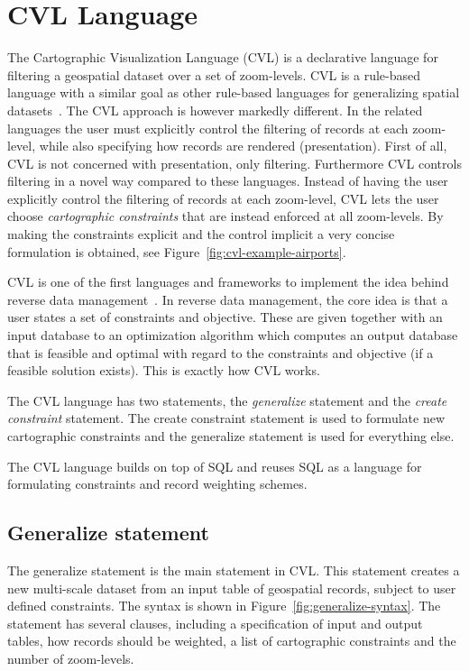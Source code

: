 \section{CVL Language}
\label{sec:cvl-language}
The Cartographic Visualization Language (CVL) is a declarative language for filtering a geospatial dataset over a set of zoom-levels. CVL is a rule-based language with a similar goal as other rule-based languages for generalizing spatial datasets~\cite{sld,mapnik}. The CVL approach is however markedly different. In the related languages the user must explicitly control the filtering of records at each zoom-level, while also specifying how records are rendered (presentation). First of all, CVL is not concerned with presentation, only filtering. Furthermore CVL controls filtering in a novel way compared to these languages. Instead of having the user explicitly control the filtering of records at each zoom-level, CVL lets the user choose \emph{cartographic constraints} that are instead enforced at all zoom-levels. By making the constraints explicit and the control implicit a very concise formulation is obtained, see Figure~\ref{fig:cvl-example-airports}.

CVL is one of the first languages and frameworks to implement the idea behind reverse data management~\cite{reverse}. In reverse data management, the core idea is that a user states a set of constraints and objective. These are given together with an input database to an optimization algorithm which computes an output database that is feasible and optimal with regard to the constraints and objective (if a feasible solution exists). This is exactly how CVL works. 

The CVL language has two statements, the \emph{generalize} statement and the \emph{create constraint} statement. The create constraint statement is used to formulate new cartographic constraints and the generalize statement is used for everything else. 

The CVL language builds on top of SQL and reuses SQL as a language for formulating constraints and record weighting schemes.

\subsection{Generalize statement}
\label{sec:generalize-statement}

The generalize statement is the main statement in CVL. This statement creates a new multi-scale dataset from an input table of geospatial records, subject to user defined constraints. The syntax is shown in Figure~\ref{fig:generalize-syntax}. The statement has several clauses, including a specification of input and output tables, how records should be weighted, a list of cartographic constraints and the number of zoom-levels. 

